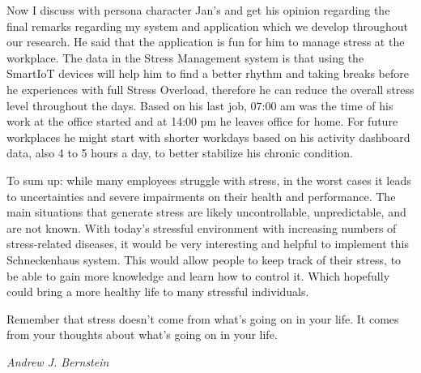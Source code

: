 Now I discuss with persona character Jan's and get his opinion regarding the final remarks regarding my system and application which we develop throughout our research. He said that the application is fun for him to manage stress at the workplace. The data in the Stress Management system is that using the Smart\acs{IoT} devices will help him to find a better rhythm and taking breaks before he experiences with full Stress Overload, therefore he can reduce the overall stress level throughout the days. Based on his last job, 07:00 am was the time of his work at the office started and at 14:00 pm he leaves office for home. For future workplaces he might start with shorter workdays based on his activity dashboard data, also 4 to 5 hours a day, to better stabilize his chronic condition.
 
To sum up: while many employees struggle with stress,  in the worst cases it leads to uncertainties and severe impairments on their health and performance.  The main situations that generate stress are likely uncontrollable,  unpredictable,  and are not known. With today’s stressful environment with increasing numbers of stress-related diseases, it would be very interesting and helpful to implement this Schneckenhaus system. This would allow people to keep track of their stress, to be able to gain more knowledge and learn how to control it. Which hopefully could bring a more healthy life to many stressful individuals.

\epigraph{Remember that stress doesn’t come from what’s going on in your life. It comes from your thoughts about what’s going on in your life.}{\textit{Andrew J. Bernstein \\ \citep{Nelson2016ProphetsSeminar}}}



